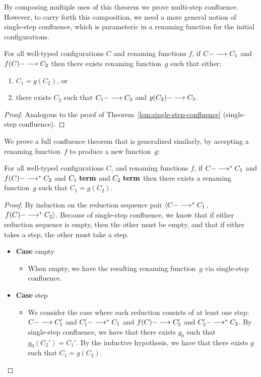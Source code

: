 By composing multiple uses of this theorem
we prove multi-step confluence.
However, to carry forth this composition, we need a more general
notion of single-step confluence, which is parameteric in a renaming
function for the initial configurations.

\begin{theorem}
For all well-typed configurations $C$ 
and renaming functions $f$,
%
 if $C ---> C_1$ 
and $f(C) ---> C_2$ 
then 
there exists renaming function~$g$ 
such that either:
\begin{enumerate}
\item %
$C_1 = g(C_2)$,
or
\item there exists $C_3$ such that $C_1 ---> C_3$ and $g(C_2) ---> C_3$.
\end{enumerate}
\begin{proof}
  Analogous to the proof of Theorem~\ref{lem:single-step-confluence}
  (single-step confluence).
\end{proof}
\end{theorem}

We prove a full confluence theorem that is generalized similarly, by
accepting a renaming function~$f$ to produce a new function~$g$:

\begin{theorem}
For all well-typed configurations $C$,
and renaming functions $f$,
%
 if $C --->^\ast C_1$ 
and $f(C) --->^\ast C_2$ 
and $C_1~\textbf{term}$
and $C_2~\textbf{term}$
then 
there exists a renaming function~$g$ 
such that $C_1 = g(C_2)$.
\begin{proof}
  By induction on the reduction sequence pair
  $\left< C --->^\ast C_1\right.$, 
  $\left.f(C) --->^\ast C_2 \right>$.
  Because of single-step confluence, we know that
  if either reduction sequence is empty, then the other must be empty,
  and that
  if either takes a step, the other must take a step.

   \begin{itemize}[leftmargin=*]
   \item[] \textbf{Case} empty
     \begin{itemize}[leftmargin=*]
       \item[] When empty, we have the resulting renaming function~$g$ via
         single-step confluence.
     \end{itemize}

   \item[] \textbf{Case} step
     \begin{itemize}[leftmargin=*]
       \item[] We consider the case where each reduction consists of at least
         one step: $C ---> C_1'$ and $C_1' --->^\ast C_1$ and
         $f(C) ---> C_2'$ and $C_2' --->^\ast C_2$.  By single-step
         confluence, we have that there exists $g_0$ such that $g_0(C_2') =
         C_1'$.  By the inductive hypothesis, we have that there exists $g$ such
         that $C_1 = g(C_2)$.
     \end{itemize}     
   \end{itemize}
\end{proof}
\end{theorem}
